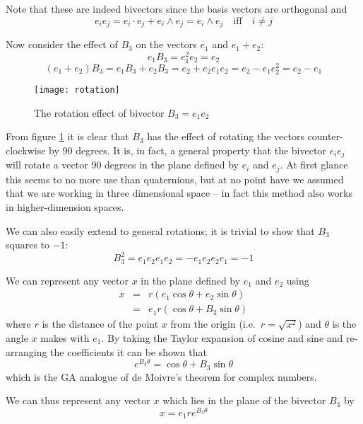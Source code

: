 Note that these are indeed bivectors since the basis vectors are orthogonal and
\[
e_ie_j = e_i \cdot e_j + e_i \wedge e_j = e_i \wedge e_j \quad \mbox{iff} \quad i \ne j
\]

Now consider the effect of $B_3$ on the vectors $e_1$ and $e_1 + e_2$:
\begin{displaymath}
e_1B_3 = e_1^2e_2=e_2 
\end{displaymath}
\begin{displaymath}
(e_1 + e_2)B_3 = e_1B_3 + e_2B_3 = e_2 + e_2e_1e_2 = e_2 - e_1e_2^2 = e_2 - e_1
\end{displaymath}

\begin{figure}
\centering
\texttt{[image: rotation]}
\caption{The rotation effect of bivector $B_3 = e_1e_2$\label{fig:rotation}}
\end{figure}

From figure \ref{fig:rotation} it is clear that $B_3$ has the effect
of rotating the vectors counter-clockwise by 90 degrees. It is, in fact, a
general property that the bivector $e_ie_j$ will rotate a vector 90 degrees in
the plane defined by $e_i$ and $e_j$. At first glance this seems to 
no more use than quaternions, but at no point have we assumed that we are
working in three dimensional space -- in fact this method also works in higher-dimension
spaces.

We can also easily extend to general rotations; it is trivial to
show that $B_3$ squares to $-1$:
\begin{displaymath}
B_3^2 = e_1e_2e_1e_2 = -e_1e_2e_2e_1 = -1
\end{displaymath}

We can represent any vector $x$ in the plane defined by $e_1$ and
$e_2$ using
\begin{eqnarray*}
x & = & r ( e_1 \cos \theta + e_2 \sin \theta) \\
  & = & e_1 r ( \cos \theta + B_3 \sin \theta)
\end{eqnarray*}
where $r$ is the distance of the point $x$ from the origin (i.e.\ $r = \sqrt{x^2}$)
and $\theta$ is the angle $x$ makes with $e_1$. 
By taking the Taylor expansion of cosine
and sine and re-arranging the coefficients it can be shown that
\[
e^{B_3\theta} = \cos \theta + B_3 \sin \theta
\]
which is the GA analogue of de Moivre's theorem for complex
numbers.

We can thus represent any vector $x$ which lies in the plane of the
bivector $B_3$ by
\[
x=e_1re^{B_3\theta}
\]

